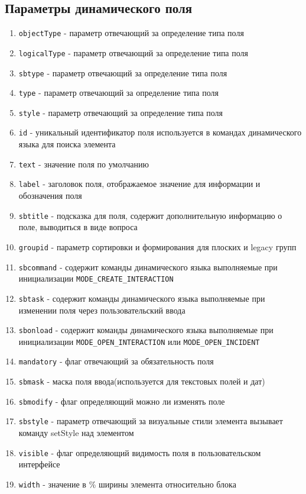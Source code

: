 \documentclass[../index.tex]{subfiles}
\begin{document}
\subsection{Параметры динамического поля}
\begin{enumerate}
	\item \verb|objectType| - параметр отвечающий за определение типа поля
	\item \verb|logicalType| - параметр отвечающий за определение типа поля
	\item \verb|sbtype| - параметр отвечающий за определение типа поля
	\item \verb|type| - параметр отвечающий за определение типа поля
	\item \verb|style| - параметр отвечающий за определение типа поля
	\item \verb|id| - уникальный идентификатор поля используется в командах динамического языка для поиска элемента
	\item \verb|text| - значение поля по умолчанию
	\item \verb|label| - заголовок поля, отображаемое значение для информации и обозначения поля
	\item \verb|sbtitle| - подсказка для поля, содержит дополнительную информацию о поле, выводиться в виде вопроса
	\item \verb|groupid| - параметр сортировки и формирования для плоских и legacy групп
	\item \verb|sbcommand| - содержит команды динамического языка выполняемые при инициализации \verb|MODE_CREATE_INTERACTION|
	\item \verb|sbtask| - содержит команды динамического языка выполняемые при изменении поля через пользовательский ввода
	\item \verb|sbonload| - содержит команды динамического языка выполняемые при инициализации \verb|MODE_OPEN_INTERACTION| или \verb|MODE_OPEN_INCIDENT|
	\item \verb|mandatory| - флаг отвечающий за обязательность поля
	\item \verb|sbmask| - маска поля ввода(используется для текстовых полей и дат)
	\item \verb|sbmodify| - флаг определяющий можно ли изменять поле
	\item \verb|sbstyle| - параметр отвечающий за визуальные стили элемента вызывает команду setStyle над элементом
	\item \verb|visible| - флаг определяющий видимость поля в пользовательском интерфейсе
	\item \verb|width| - значение в \% ширины элемента относительно блока

\end{enumerate}
\end{document}
